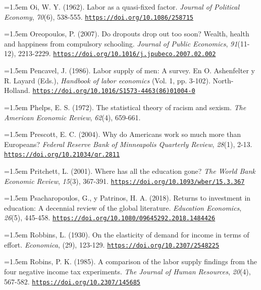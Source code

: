 \documentclass[10pt,a4paper]{article}
\begin{document}
\noindent\hangindent=1.5em Oi, W. Y. (1962). Labor as a quasi-fixed factor. \textit{Journal of Political Economy}, \textit{70}(6), 538-555. \href{https://doi.org/10.1086/258715}{\nolinkurl{https://doi.org/10.1086/258715}}

\noindent\hangindent=1.5em Oreopoulos, P. (2007). Do dropouts drop out too soon? Wealth, health and happiness from compulsory schooling. \textit{Journal of Public Economics}, \textit{91}(11-12), 2213-2229. \href{https://doi.org/10.1016/j.jpubeco.2007.02.002}{\nolinkurl{https://doi.org/10.1016/j.jpubeco.2007.02.002}}

\noindent\hangindent=1.5em Pencavel, J. (1986). Labor supply of men: A survey. En O. Ashenfelter y R. Layard (Eds.), \textit{Handbook of labor economics} (Vol. 1, pp. 3-102). North-Holland. \href{https://doi.org/10.1016/S1573-4463(86)01004-0}{\nolinkurl{https://doi.org/10.1016/S1573-4463(86)01004-0}}

\noindent\hangindent=1.5em Phelps, E. S. (1972). The statistical theory of racism and sexism. \textit{The American Economic Review}, \textit{62}(4), 659-661.

\noindent\hangindent=1.5em Prescott, E. C. (2004). Why do Americans work so much more than Europeans? \textit{Federal Reserve Bank of Minneapolis Quarterly Review}, \textit{28}(1), 2-13. \href{https://doi.org/10.21034/qr.2811}{\nolinkurl{https://doi.org/10.21034/qr.2811}}

\noindent\hangindent=1.5em Pritchett, L. (2001). Where has all the education gone? \textit{The World Bank Economic Review}, \textit{15}(3), 367-391. \href{https://doi.org/10.1093/wber/15.3.367}{\nolinkurl{https://doi.org/10.1093/wber/15.3.367}}

\noindent\hangindent=1.5em Psacharopoulos, G., y Patrinos, H. A. (2018). Returns to investment in education: A decennial review of the global literature. \textit{Education Economics}, \textit{26}(5), 445-458. \href{https://doi.org/10.1080/09645292.2018.1484426}{\nolinkurl{https://doi.org/10.1080/09645292.2018.1484426}}

\noindent\hangindent=1.5em Robbins, L. (1930). On the elasticity of demand for income in terms of effort. \textit{Economica}, (29), 123-129. \href{https://doi.org/10.2307/2548225}{\nolinkurl{https://doi.org/10.2307/2548225}}

\noindent\hangindent=1.5em Robins, P. K. (1985). A comparison of the labor supply findings from the four negative income tax experiments. \textit{The Journal of Human Resources}, \textit{20}(4), 567-582. \href{https://doi.org/10.2307/145685}{\nolinkurl{https://doi.org/10.2307/145685}}
\end{document}
